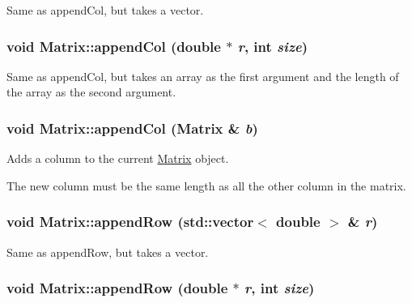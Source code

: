 Same as appendCol, but takes a vector. 

\hypertarget{class_matrix_ae8efe9de26740e3c953e43de55963b2}{
\subsubsection[{appendCol}]{\setlength{\rightskip}{0pt plus 5cm}void Matrix::appendCol (double $\ast$ {\em r}, \/  int {\em size})}}
\label{class_matrix_ae8efe9de26740e3c953e43de55963b2}


Same as appendCol, but takes an array as the first argument and the length of the array as the second argument. 

\hypertarget{class_matrix_6d7061bb02cf34f6c79a01ff25b41e84}{
\subsubsection[{appendCol}]{\setlength{\rightskip}{0pt plus 5cm}void Matrix::appendCol ({\bf Matrix} \& {\em b})}}
\label{class_matrix_6d7061bb02cf34f6c79a01ff25b41e84}


Adds a column to the current \hyperlink{class_matrix}{Matrix} object. 

The new column must be the same length as all the other column in the matrix. \hypertarget{class_matrix_934b0686d9a2b971e9740b9a29224a54}{
\subsubsection[{appendRow}]{\setlength{\rightskip}{0pt plus 5cm}void Matrix::appendRow (std::vector$<$ double $>$ \& {\em r})}}
\label{class_matrix_934b0686d9a2b971e9740b9a29224a54}


Same as appendRow, but takes a vector. 

\hypertarget{class_matrix_55104cb3fcf93a887ac713955fc0f5c9}{
\subsubsection[{appendRow}]{\setlength{\rightskip}{0pt plus 5cm}void Matrix::appendRow (double $\ast$ {\em r}, \/  int {\em size})}}
\label{class_matrix_55104cb3fcf93a887ac713955fc0f5c9}


